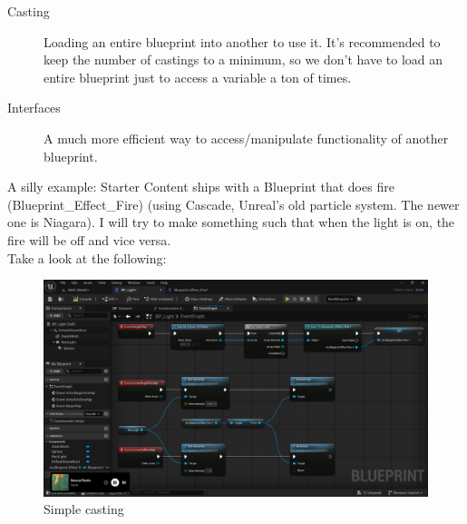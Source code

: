 \documentclass[]{article}
\begin{document}
	\begin{description}
		\item[Casting] Loading an entire blueprint into another to use it. It's recommended to keep the number of castings to a minimum, so we don't have to load an entire blueprint just to access a variable a ton of times.
		\item[Interfaces] A much more efficient way to access/manipulate functionality of another blueprint. 
	\end{description}
	
	A silly example: Starter Content ships with a Blueprint that does fire (Blueprint\_Effect\_Fire) (using Cascade, Unreal's old particle system. The newer one is Niagara). I will try to make something such that when the light is on, the fire will be off and vice versa. 
	\\[10pt]
	Take a look at the following:
	\begin{figure}[h]
		\centering
		\includegraphics[width=1\linewidth]{day4images/screenshot017}
		\caption{Simple casting}
		\label{fig:screenshot017}
	\end{figure}
	
	
	
\end{document}
